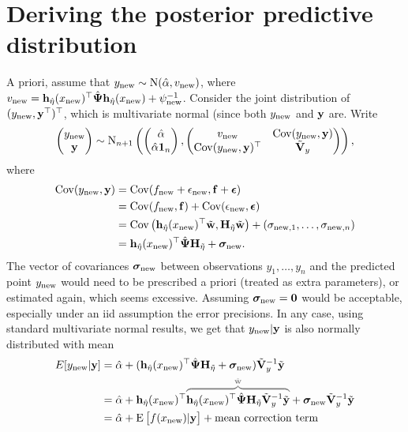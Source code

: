 \section{Deriving the posterior predictive distribution}
\label{apx:postpred}

A priori, assume that $y_{\text{new}} \sim \operatorname{N}(\hat\alpha, v_{\text{new}})$, where $v_{\text{new}} =  {\mathbf h}_{\hat\eta}(x_{\text{new}})^\top \hat{{\bm\Psi}} {\mathbf h}_{\hat\eta}(x_{\text{new}}) + \psi^{-1}_{\text{new}} $.
Consider the joint distribution of $(y_{\text{new}},{\mathbf y}^\top)^\top$, which is multivariate normal (since both $y_{\text{new}}$ and ${\mathbf y}$ are.
Write
\[
  \begin{pmatrix}
    y_{\text{new}} \\
    {\mathbf y}
  \end{pmatrix}
  \sim \operatorname{N}_{n+1}
  \left(
    \begin{pmatrix}
      \hat\alpha \\
      \hat\alpha{\mathbf 1}_n
    \end{pmatrix},
    \begin{pmatrix}
      v_{\text{new}} &\operatorname{Cov}(y_{\text{new}},{\mathbf y}) \\
      \operatorname{Cov}(y_{\text{new}},{\mathbf y})^\top &\tilde{{\mathbf V}}_y \\
    \end{pmatrix}
  \right),
\]
where 
\begin{align*}
  \operatorname{Cov}(y_{\text{new}},{\mathbf y})
  &= \operatorname{Cov}(f_{\text{new}} + \epsilon_{\text{new}}, {\mathbf f} + {\bm\epsilon}) \\
  &= \operatorname{Cov}(f_{\text{new}}, {\mathbf f}) + \operatorname{Cov}(\epsilon_{\text{new}}, {\bm\epsilon}) \\
  &= \operatorname{Cov}\left({\mathbf h}_{\hat\eta}(x_{\text{new}})^\top \tilde{\mathbf w},{\mathbf H}_{\tilde\eta}\tilde{\mathbf w} \right) + (\sigma_{{\text{new}},1},\dots,\sigma_{{\text{new}},n}) \\
  &= {\mathbf h}_{\hat\eta}(x_{\text{new}})^\top\hat{{\bm\Psi}}{\mathbf H}_{\tilde\eta} + {\bm\sigma}_{\text{new}}.
\end{align*}
The vector of covariances ${\bm\sigma}_{\text{new}}$ between observations $y_1,\dots,y_n$ and the predicted point $y_{\text{new}}$ would need to be prescribed a priori (treated as extra parameters), or estimated again, which seems excessive.
Assuming ${\bm\sigma}_{\text{new}} = {\mathbf 0}$ would be acceptable, especially under an iid assumption the error precisions.
In any case, using standard multivariate normal results, we get that $y_{\text{new}}|{\mathbf y}$ is also normally distributed with mean
\begin{align*}
  E[y_\new|\by] 
  &= \hat\alpha + (\bh_{\hat\eta}(x_\new)^\top\hat\bPsi\bH_{\tilde\eta} + \bsigma_\new)\tilde\bV_y^{-1}\tilde\by  \\
  &= \hat\alpha + \bh_{\hat\eta}(x_\new)^\top
  \myoverbrace{\bh_{\hat\eta}(x_\new)^\top\hat\bPsi\bH_{\tilde\eta}\tilde\bV_y^{-1}\tilde\by}{\hat\bw}
  + \bsigma_\new \tilde\bV_y^{-1}\tilde\by \\
  &= \hat\alpha + \E \big[ f(x_\new) |\by \big] + \text{mean correction term}
\end{align*}
